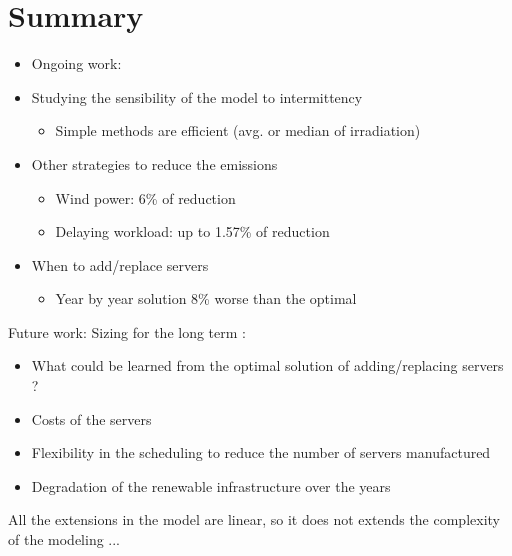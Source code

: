 \section{Summary}


\label{sec:long_term_conclusion}

\begin{itemize}
  \item Ongoing work:  
  \item Studying the sensibility of the model to intermittency    
    \begin{itemize}      
    \item Simple methods are efficient (avg. or median of irradiation)
    \end{itemize}

  \item Other strategies to reduce the  emissions
    \begin{itemize}      
    \item Wind power: 6\% of reduction
    \item Delaying workload: up to 1.57\% of reduction      
    \end{itemize}
    
  \item When to add/replace servers

    \begin{itemize}
      
    \item Year by year solution 8\% worse than the optimal

      
    \end{itemize}
    
   
  \end{itemize}

  Future work:   Sizing for the long term :

  \begin{itemize}
    
  \item What could be learned from the optimal solution of adding/replacing servers ?

  \item Costs of the servers     

  \item Flexibility in the scheduling to reduce the number of
    servers manufactured

  \item Degradation of the renewable infrastructure over the years
    
  \end{itemize}

  
  All the extensions in the model are linear, so it does not extends the complexity of the modeling ...
